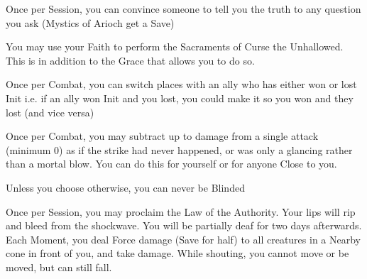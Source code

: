 {\GOD[
Name=Bahamut,
Link=small-god-bahamut,
GodOf=Lord of Truth and Light,
Holy=an iron or silver circlet embossed with an arrow pointing upwards
]


Once per Session, you can convince someone to tell you the truth to any question you ask (Mystics of Arioch get a Save)


You may use your Faith to perform the Sacraments of Curse the Unhallowed.  This is in addition to the Grace that allows you to do so.




\GOD[
Name=Chrontics,
Link=small-god-chrontics,
GodOf=Lord of Time,
Holy=an amulet (silver preferred) embossed with a hammered hourglass
]


Once per Combat, you can switch places with an ally who has either won or lost Init i.e.  if an ally won Init and you lost, you could make it so you won and they lost (and vice versa)  


Once per Combat, you may subtract up to \SUMDICE damage from a single attack (minimum 0) as if the strike had never happened, or was only a glancing rather than a mortal blow.  You can do this for yourself or for anyone Close to you.




\GOD[
Name=Marduk,
Link=small-god-marduk,
GodOf=God of Law,
Holy=an unblinking eye worn on a linen headband
]


Unless you choose otherwise, you can never be Blinded


Once per Session, you may proclaim the Law of the Authority.  Your lips will rip and bleed from the shockwave. You will be partially deaf for two days afterwards. Each Moment, you deal \SUMDICE Force damage (Save for half) to all creatures in a Nearby cone in front of you, and take \DICE damage. While shouting, you cannot move or be moved, but can still fall.





\GOD[
Name=Mitra,
Link=small-god-mitra,
GodOf=Seraph of Obedience and Protection,
Holy=an iron thorn (coincidentally in the shape of a modern bullet) suspended from a chain around the neck
]

}
